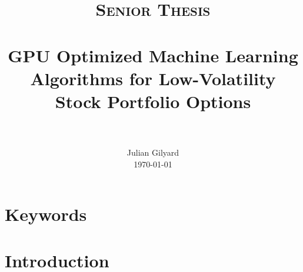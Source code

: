 \documentclass[paper=letter, fontsize=11pt]{scrartcl}
\title{
		\usefont{OT1}{bch}{b}{n}
		\normalfont \normalsize \textsc{Senior Thesis} \\ [25pt]
		\horrule{0.5pt} \\[0.4cm]
		\huge GPU Optimized Machine Learning Algorithms for Low-Volatility Stock Portfolio Options \\
		\horrule{2pt} \\[0.5cm]
}
\author{
	\normalfont \normalsize
        Julian Gilyard\\[-3pt]		
	\normalsize
        \today
}
\date{}
\numberwithin{equation}{section}		%
\numberwithin{figure}{section}			%
\numberwithin{table}{section}				%
\begin{document}
\maketitle

\tableofcontents

\begin{spacing}{1.5}
\section*{Keywords}
\section{Introduction}


\end{spacing}

 
\end{document}
